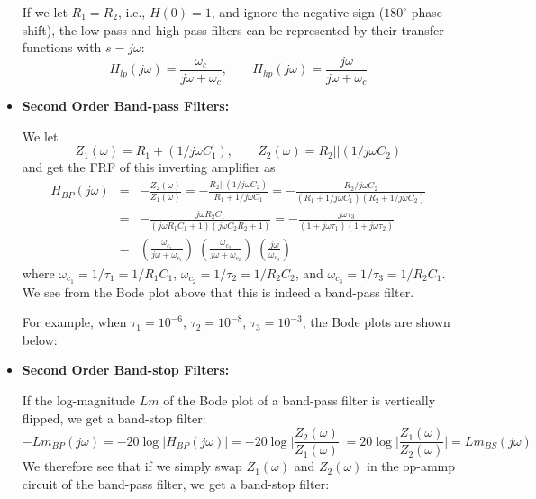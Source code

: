 \documentclass{article}
\begin{document}
\begin{itemize}

  If we let $R_1=R_2$, i.e., $H(0)=1$, and ignore the negative sign ($180^\circ$
  phase shift), the low-pass and high-pass filters can be represented by their
  transfer functions with $s=j\omega$:
  \begin{equation}
  H_{lp}(j\omega)=\frac{\omega_c}{j\omega+\omega_c},
  \;\;\;\;\;\;\;H_{hp}(j\omega)=\frac{j\omega}{j\omega+\omega_c}
  \end{equation}

\item {\bf Second Order Band-pass Filters:}


  We let 
  \begin{equation}
  Z_1(\omega)=R_1+(1/j\omega C_1),\;\;\;\;\;\;\;
  Z_2(\omega)=R_2||(1/j\omega C_2)
  \end{equation}
  and get the FRF of this inverting amplifier as
  \begin{eqnarray}
    H_{BP}(j\omega)&=&-\frac{Z_2(\omega)}{Z_1(\omega)}
    =-\frac{R_2||(1/j\omega C_2)}{R_1+1/j\omega C_1}
    =-\frac{R_2/j\omega C_2}{(R_1+1/j\omega C_1)(R_2+1/j\omega C_2)}
    \nonumber \\
    &=&-\frac{j\omega R_2C_1}{(j\omega R_1C_1+1)(j\omega C_2R_2+1)}
    =-\frac{j\omega \tau_3}{(1+j\omega \tau_1)(1+j\omega \tau_2)} 
    \nonumber \\
    &=&\left(\frac{\omega_{c_1}}{j\omega+\omega_{c_1}}\right)\;
    \left(\frac{\omega_{c_2}}{j\omega+\omega_{c_2}}\right)\;
    \left(\frac{j\omega}{\omega_{c_3}}\right)
  \end{eqnarray}
  where $\omega_{c_1}=1/\tau_1=1/R_1C_1$, $\omega_{c_2}=1/\tau_2=1/R_2C_2$, 
  and $\omega_{c_3}=1/\tau_3=1/R_2C_1$. We see from the Bode plot above
  that this is indeed a band-pass filter.

  For example, when $\tau_1=10^{-6}$, $\tau_2=10^{-8}$, $\tau_3=10^{-3}$, 
  the Bode plots are shown below:


\item {\bf Second Order Band-stop Filters:}

  If the log-magnitude $Lm$ of the Bode plot of a band-pass filter is 
  vertically flipped, we get a band-stop filter:
  \begin{equation}
  -Lm_{BP}(j\omega)=-20\log |H_{BP}(j\omega)|
  =-20\log \bigg| \frac{Z_2(\omega)}{Z_1(\omega)} \bigg|
  =20\log \bigg| \frac{Z_1(\omega)}{Z_2(\omega)} \bigg|
  =Lm_{BS}(j\omega)
  \end{equation}
  We therefore see that if we simply swap $Z_1(\omega)$ and $Z_2(\omega)$ 
  in the op-ammp circuit of the band-pass filter, we get a band-stop filter:


\end{itemize}
\end{document}
